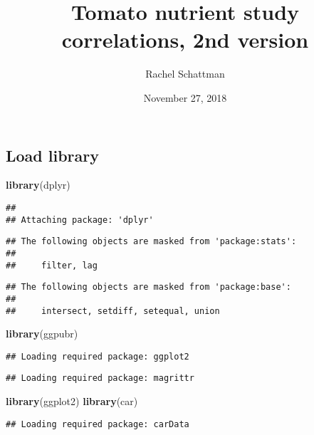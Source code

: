 \documentclass[]{article}
\title{Tomato nutrient study correlations, 2nd version}
\author{Rachel Schattman}
\date{November 27, 2018}
\newenvironment{Shaded}{\begin{snugshade}}{\end{snugshade}}
\newcommand{\KeywordTok}[1]{\textcolor[rgb]{0.13,0.29,0.53}{\textbf{{#1}}}}
\newcommand{\NormalTok}[1]{{#1}}
\begin{document}
\maketitle

\subsection{Load library}\label{load-library}

\begin{Shaded}
\begin{Highlighting}[]
\KeywordTok{library}\NormalTok{(dplyr)}
\end{Highlighting}
\end{Shaded}

\begin{verbatim}
## 
## Attaching package: 'dplyr'
\end{verbatim}

\begin{verbatim}
## The following objects are masked from 'package:stats':
## 
##     filter, lag
\end{verbatim}

\begin{verbatim}
## The following objects are masked from 'package:base':
## 
##     intersect, setdiff, setequal, union
\end{verbatim}

\begin{Shaded}
\begin{Highlighting}[]
\KeywordTok{library}\NormalTok{(ggpubr)}
\end{Highlighting}
\end{Shaded}

\begin{verbatim}
## Loading required package: ggplot2
\end{verbatim}

\begin{verbatim}
## Loading required package: magrittr
\end{verbatim}

\begin{Shaded}
\begin{Highlighting}[]
\KeywordTok{library}\NormalTok{(ggplot2)}
\KeywordTok{library}\NormalTok{(car)}
\end{Highlighting}
\end{Shaded}

\begin{verbatim}
## Loading required package: carData
\end{verbatim}
\end{document}
